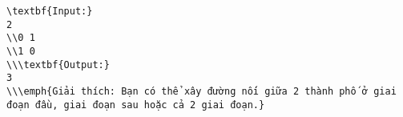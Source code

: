 \begin{verbatim}
\textbf{Input:}
2
\\0 1
\\1 0
\\\textbf{Output:}
3
\\\emph{Giải thích: Bạn có thể xây đường nối giữa 2 thành phố ở giai đoạn đầu, giai đoạn sau hoặc cả 2 giai đoạn.}\end{verbatim}